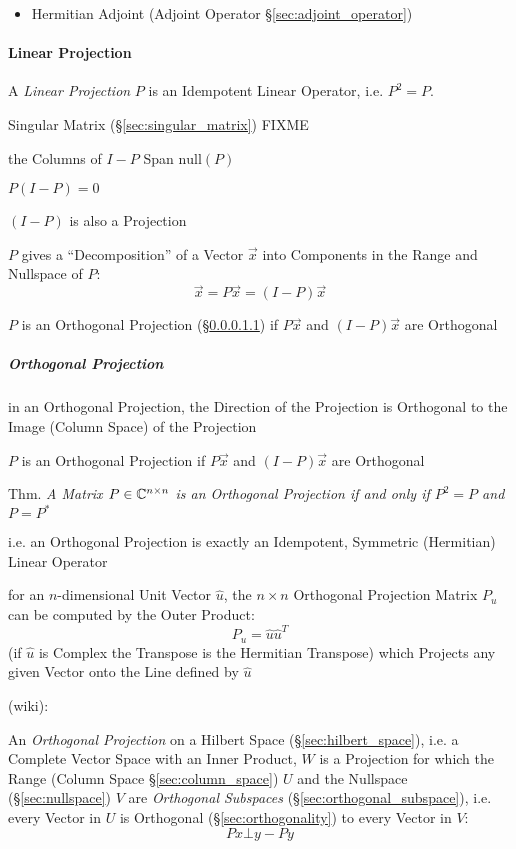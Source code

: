 \begin{itemize}
  \item Hermitian Adjoint (Adjoint Operator \S\ref{sec:adjoint_operator})
\end{itemize}



\paragraph{Linear Projection}\label{sec:projection}\hfill

A \emph{Linear Projection} $P$ is an Idempotent Linear Operator, i.e. $P^2 = P$.

Singular Matrix (\S\ref{sec:singular_matrix}) FIXME

the Columns of $I - P$ Span $\mathrm{null}(P)$

$P(I - P) = 0$

$(I - P)$ is also a Projection

$P$ gives a ``Decomposition'' of a Vector $\vec{x}$ into Components in the
Range and Nullspace of $P$:
\[
  \vec{x} = P\vec{x} = (I - P)\vec{x}
\]

$P$ is an Orthogonal Projection (\S\ref{sec:orthogonal_projection}) if
$P\vec{x}$ and $(I-P)\vec{x}$ are Orthogonal



\subparagraph{Orthogonal Projection}\label{sec:orthogonal_projection}\hfill

in an Orthogonal Projection, the Direction of the Projection is Orthogonal to
the Image (Column Space) of the Projection

$P$ is an Orthogonal Projection if $P\vec{x}$ and $(I-P)\vec{x}$ are Orthogonal

Thm. \emph{A Matrix $P \in \mathbb{C}^{n \times n}$ is an Orthogonal Projection if
  and only if $P^2 = P$ and $P = P^*$}

i.e. an Orthogonal Projection is exactly an Idempotent, Symmetric (Hermitian)
Linear Operator

for an $n$-dimensional Unit Vector $\hat{u}$, the $n \times n$ Orthogonal
Projection Matrix $P_u$ can be computed by the Outer Product:
\[
  P_u = \hat{u}\hat{u}^T
\]
(if $\hat{u}$ is Complex the Transpose is the Hermitian Transpose) which
Projects any given Vector onto the Line defined by $\hat{u}$

(wiki):

An \emph{Orthogonal Projection} on a Hilbert Space (\S\ref{sec:hilbert_space}),
i.e. a Complete Vector Space with an Inner Product,
$W$ is a Projection for which the Range (Column Space \S\ref{sec:column_space})
$U$ and the Nullspace (\S\ref{sec:nullspace}) $V$ are \emph{Orthogonal
  Subspaces} (\S\ref{sec:orthogonal_subspace}), i.e. every Vector in $U$ is
Orthogonal (\S\ref{sec:orthogonality}) to every Vector in $V$:
\[
  Px \bot y - Py
\]

